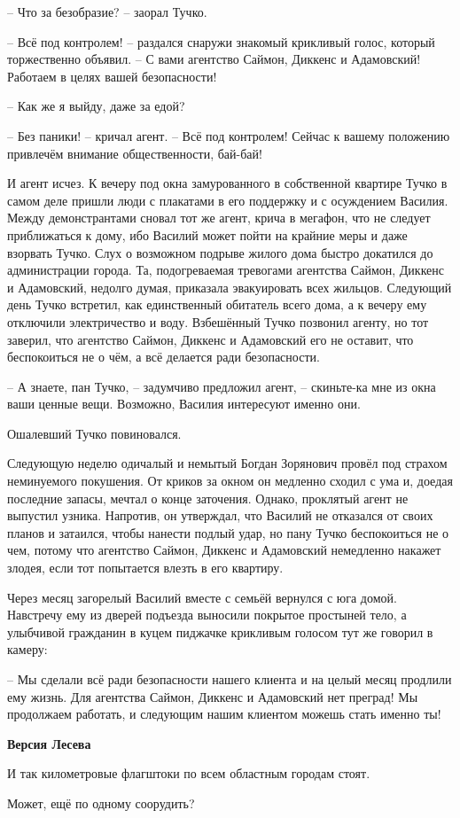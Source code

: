 \begin{itemize}
– Что за безобразие? – заорал Тучко.

– Всё под контролем! – раздался снаружи знакомый крикливый голос, который
торжественно объявил. – С вами агентство Саймон, Диккенс и Адамовский! Работаем
в целях вашей безопасности!

– Как же я выйду, даже за едой?

– Без паники! – кричал агент. – Всё под контролем! Сейчас к вашему положению
привлечём внимание общественности, бай-бай!

И агент исчез. К вечеру под окна замурованного в собственной квартире Тучко в
самом деле пришли люди с плакатами в его поддержку и с осуждением Василия.
Между демонстрантами сновал тот же агент, крича в мегафон, что не следует
приближаться к дому, ибо Василий может пойти на крайние меры и даже взорвать
Тучко. Слух о возможном подрыве жилого дома быстро докатился до администрации
города. Та, подогреваемая тревогами агентства Саймон, Диккенс и Адамовский,
недолго думая, приказала эвакуировать всех жильцов. Следующий день Тучко
встретил, как единственный обитатель всего дома, а к вечеру ему отключили
электричество и воду. Взбешённый Тучко позвонил агенту, но тот заверил, что
агентство Саймон, Диккенс и Адамовский его не оставит, что беспокоиться не о
чём, а всё делается ради безопасности.

– А знаете, пан Тучко, – задумчиво предложил агент, – скиньте-ка мне из окна
ваши ценные вещи. Возможно, Василия интересуют именно они.

Ошалевший Тучко повиновался.

Следующую неделю одичалый и немытый Богдан Зорянович провёл под страхом
неминуемого покушения. От криков за окном он медленно сходил с ума и, доедая
последние запасы, мечтал о конце заточения. Однако, проклятый агент не выпустил
узника. Напротив, он утверждал, что Василий не отказался от своих планов и
затаился, чтобы нанести подлый удар, но пану Тучко беспокоиться не о чем,
потому что агентство Саймон, Диккенс и Адамовский немедленно накажет злодея,
если тот попытается влезть в его квартиру.

Через месяц загорелый Василий вместе с семьёй вернулся с юга домой. Навстречу
ему из дверей подъезда выносили покрытое простыней тело, а улыбчивой гражданин
в куцем пиджачке крикливым голосом тут же говорил в камеру:

– Мы сделали всё ради безопасности нашего клиента и на целый месяц продлили ему
жизнь. Для агентства Саймон, Диккенс и Адамовский нет преград! Мы продолжаем
работать, и следующим нашим клиентом можешь стать именно ты!

\textbf{Версия Лесева}

И так километровые флагштоки по всем областным городам стоят. 

Может, ещё по одному соорудить?

\end{itemize} %
